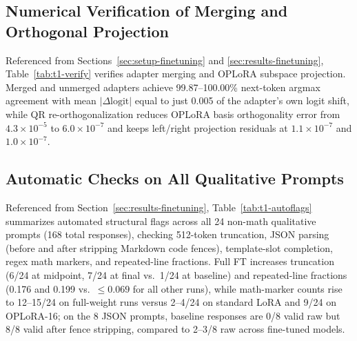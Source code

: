 \documentclass{article}
\begin{document}
\subsection{Numerical Verification of Merging and Orthogonal Projection}
\label{app:ft-verification}
Referenced from Sections~\ref{sec:setup-finetuning} and \ref{sec:results-finetuning}, Table~\ref{tab:t1-verify} verifies adapter merging and OPLoRA subspace projection. Merged and unmerged adapters achieve 99.87--100.00\% next-token argmax agreement with mean $|\Delta\text{logit}|$ equal to just 0.005 of the adapter's own logit shift, while QR re-orthogonalization reduces OPLoRA basis orthogonality error from $4.3\times 10^{-5}$ to $6.0\times 10^{-7}$ and keeps left/right projection residuals at $1.1\times 10^{-7}$ and $1.0\times 10^{-7}$.


\subsection{Automatic Checks on All Qualitative Prompts}
\label{app:ft-autoflags}
Referenced from Section~\ref{sec:results-finetuning}, Table~\ref{tab:t1-autoflags} summarizes automated structural flags across all 24 non-math qualitative prompts (168 total responses), checking 512-token truncation, JSON parsing (before and after stripping Markdown code fences), template-slot completion, regex math markers, and repeated-line fractions. Full FT increases truncation (6/24 at midpoint, 7/24 at final vs.\ 1/24 at baseline) and repeated-line fractions (0.176 and 0.199 vs.\ $\le 0.069$ for all other runs), while math-marker counts rise to 12--15/24 on full-weight runs versus 2--4/24 on standard LoRA and 9/24 on OPLoRA-16; on the 8 JSON prompts, baseline responses are 0/8 valid raw but 8/8 valid after fence stripping, compared to 2--3/8 raw across fine-tuned models.

\end{document}

